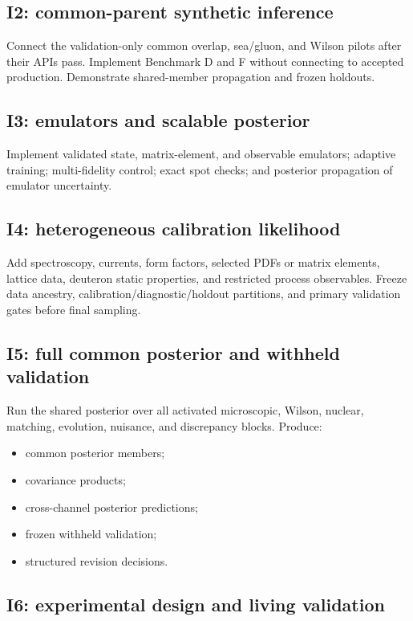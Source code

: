 \documentclass[11pt]{article}
\begin{document}
\subsection{I2: common-parent synthetic inference}

Connect the validation-only common overlap, sea/gluon, and Wilson pilots after
their APIs pass.  Implement Benchmark D and F without connecting to accepted
production.  Demonstrate shared-member propagation and frozen holdouts.

\subsection{I3: emulators and scalable posterior}

Implement validated state, matrix-element, and observable emulators; adaptive
training; multi-fidelity control; exact spot checks; and posterior propagation
of emulator uncertainty.

\subsection{I4: heterogeneous calibration likelihood}

Add spectroscopy, currents, form factors, selected PDFs or matrix elements,
lattice data, deuteron static properties, and restricted process observables.
Freeze data ancestry, calibration/diagnostic/holdout partitions, and primary
validation gates before final sampling.

\subsection{I5: full common posterior and withheld validation}

Run the shared posterior over all activated microscopic, Wilson, nuclear,
matching, evolution, nuisance, and discrepancy blocks.  Produce:
\begin{itemize}
\item common posterior members;
\item covariance products;
\item cross-channel posterior predictions;
\item frozen withheld validation;
\item structured revision decisions.
\end{itemize}

\subsection{I6: experimental design and living validation}
\end{document}
